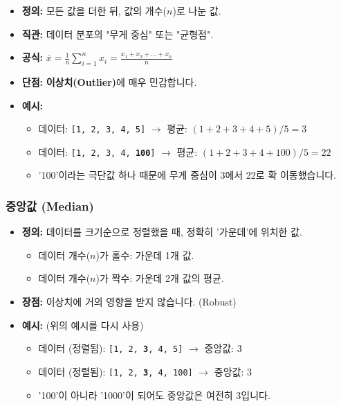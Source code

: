 \documentclass[11pt,a4paper]{book}
\theoremstyle{definition}
\begin{document}
\begin{itemize}
    \item \textbf{정의:} 모든 값을 더한 뒤, 값의 개수($n$)로 나눈 값.
    \item \textbf{직관:} 데이터 분포의 "무게 중심" 또는 "균형점".
    \item \textbf{공식:} $\overline{x} = \frac{1}{n}\sum_{i=1}^{n}x_{i} = \frac{x_1 + x_2 + \dots + x_n}{n}$
    \item \textbf{단점:} \textbf{이상치(Outlier)}에 매우 민감합니다.
    \item \textbf{예시:}
    \begin{itemize}
        \item 데이터: \texttt{[1, 2, 3, 4, 5]} $\rightarrow$ 평균: $(1+2+3+4+5) / 5 = 3$
        \item 데이터: \texttt{[1, 2, 3, 4, \textbf{100}]} $\rightarrow$ 평균: $(1+2+3+4+100) / 5 = 22$
        \item '100'이라는 극단값 하나 때문에 무게 중심이 3에서 22로 확 이동했습니다.
    \end{itemize}
\end{itemize}

\subsubsection{중앙값 (Median)}

\begin{itemize}
    \item \textbf{정의:} 데이터를 크기순으로 정렬했을 때, 정확히 '가운데'에 위치한 값.
    \begin{itemize}
        \item 데이터 개수($n$)가 홀수: 가운데 1개 값.
        \item 데이터 개수($n$)가 짝수: 가운데 2개 값의 평균.
    \end{itemize}
    \item \textbf{장점:} 이상치에 거의 영향을 받지 않습니다. (Robust)
    \item \textbf{예시:} (위의 예시를 다시 사용)
    \begin{itemize}
        \item 데이터 (정렬됨): \texttt{[1, 2, \textbf{3}, 4, 5]} $\rightarrow$ 중앙값: 3
        \item 데이터 (정렬됨): \texttt{[1, 2, \textbf{3}, 4, 100]} $\rightarrow$ 중앙값: 3
        \item '100'이 아니라 '1000'이 되어도 중앙값은 여전히 3입니다.
    \end{itemize}
\end{itemize}
\end{document}
